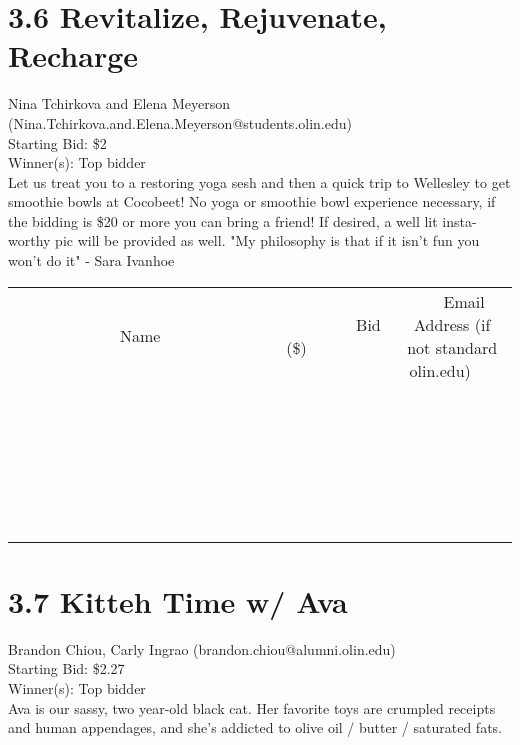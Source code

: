 \documentclass[11pt]{article}
\begin{document}
\section*{3.6 Revitalize, Rejuvenate, Recharge }
Nina Tchirkova and Elena Meyerson (Nina.Tchirkova.and.Elena.Meyerson@students.olin.edu) \\
Starting Bid: \$2 \\
Winner(s): 
Top bidder \\
Let us treat you to a restoring yoga sesh and then a quick trip to Wellesley to get smoothie bowls at Cocobeet! 
No yoga or smoothie bowl experience necessary, if the bidding is \$20 or more you can bring a friend! If desired, a well lit insta-worthy pic will be provided as well. 
"My philosophy is that if it isn't fun you won't do it" - Sara Ivanhoe \\[6ex]
\begin{tabular}{c c c}
~~~~~~~~~~~~~Name~~~~~~~~~~~~~ & ~~~~~~~~~Bid (\$)~~~~~~~~~ & ~~~Email Address (if not standard olin.edu)~~~ \\
 & & \\
\hline
 & & \\
\hline
 & & \\
\hline
 & & \\
\hline
 & & \\
\hline
 & & \\
\hline
 & & \\
\hline
 & & \\
\hline
 & & \\
\hline
 & & \\
\hline
 & & \\
\hline
 & & \\
\hline
 & & \\
\hline
 & & \\
\hline
 & & \\
\hline
 & & \\
\hline
 & & \\
\hline
 & & \\
\hline
 & & \\
\hline
 & & \\
\hline
 & & \\
\hline
 & & \\
\hline
 & & \\
\hline
 & & \\
\hline
 & & \\
\hline
 & & \\
\hline
\end{tabular}
\clearpage
\section*{3.7 Kitteh Time w/ Ava}
Brandon Chiou, Carly Ingrao (brandon.chiou@alumni.olin.edu) \\
Starting Bid: \$2.27 \\
Winner(s): 
Top bidder \\
Ava is our sassy, two year-old black cat. Her favorite toys are crumpled receipts and human appendages, and she's addicted to olive oil / butter / saturated fats.
\end{document}
